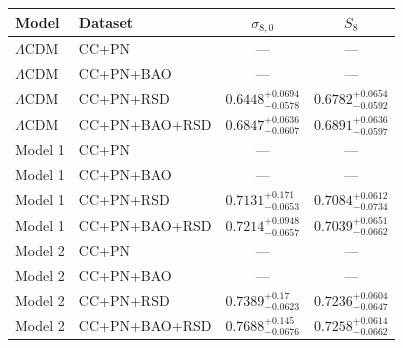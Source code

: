 \begin{tabular}{llcc}
\hline
Model & Dataset & $\sigma_{8,0}$ & $S_8$ \\
\hline
$\Lambda$CDM & CC+PN & — & — \\
$\Lambda$CDM & CC+PN+BAO & — & — \\
$\Lambda$CDM & CC+PN+RSD & $0.6448^{+0.0694}_{-0.0578}$ & $0.6782^{+0.0654}_{-0.0592}$ \\
$\Lambda$CDM & CC+PN+BAO+RSD & $0.6847^{+0.0636}_{-0.0607}$ & $0.6891^{+0.0636}_{-0.0597}$ \\
Model 1 & CC+PN & — & — \\
Model 1 & CC+PN+BAO & — & — \\
Model 1 & CC+PN+RSD & $0.7131^{+0.171}_{-0.0653}$ & $0.7084^{+0.0612}_{-0.0734}$ \\
Model 1 & CC+PN+BAO+RSD & $0.7214^{+0.0948}_{-0.0657}$ & $0.7039^{+0.0651}_{-0.0662}$ \\
Model 2 & CC+PN & — & — \\
Model 2 & CC+PN+BAO & — & — \\
Model 2 & CC+PN+RSD & $0.7389^{+0.17}_{-0.0623}$ & $0.7236^{+0.0604}_{-0.0647}$ \\
Model 2 & CC+PN+BAO+RSD & $0.7688^{+0.145}_{-0.0676}$ & $0.7258^{+0.0614}_{-0.0662}$ \\
\hline
\end{tabular}
